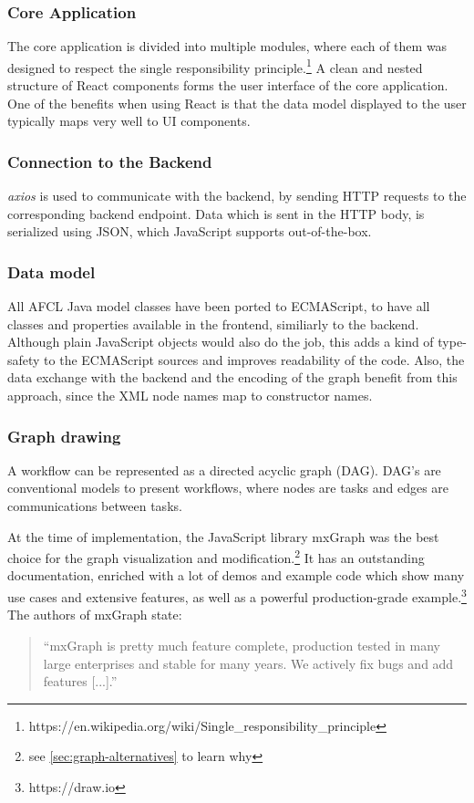 \documentclass[a4paper,top=25mm,bottom=25mm,12pt,pdftex,halfparskip,twoside,bibtotoc,numbers=noenddot]{scrbook}
\begin{document}
\subsubsection{Core Application}

The core application is divided into multiple modules, where each of them was designed to respect the single responsibility principle.\footnote{https://en.wikipedia.org/wiki/Single\_responsibility\_principle} A clean and nested structure of React components forms the user interface of the core  application. One of the benefits when using React is that the data model displayed to the user typically maps very well to UI components.

\subsubsection{Connection to the Backend}

\textit{axios} is used to communicate with the backend, by sending HTTP requests to the corresponding backend endpoint. Data which is sent in the HTTP body, is serialized using JSON, which JavaScript supports out-of-the-box.

\subsubsection{Data model}

All AFCL Java model classes have been ported to ECMAScript, to have all classes and properties available in the frontend, similiarly to the backend. Although plain JavaScript objects would also do the job, this adds a kind of type-safety to the ECMAScript sources and improves readability of the code. Also, the data exchange with the backend and the encoding of the graph benefit from this approach, since the XML node names map to constructor names.

\subsubsection{Graph drawing}

A workflow can be represented as a directed acyclic graph (DAG). DAG's are conventional models to present workflows, where nodes are tasks and edges are communications between tasks.

At the time of implementation, the JavaScript library mxGraph was the best choice for the graph visualization and modification.\footnote{see \ref{sec:graph-alternatives} to learn why}
It has an outstanding documentation, enriched with a lot of demos and example code which show many use cases and extensive features, as well as a powerful production-grade example.\footnote{https://draw.io}\\
The authors of mxGraph state:\\
\begin{quote}
``mxGraph is pretty much feature complete, production tested in many large enterprises and stable for many years. We actively fix bugs and add features [...].''
\end{quote}
\end{document}
